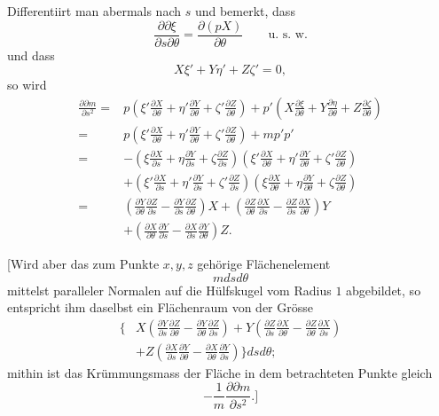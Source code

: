 %
\par\indent Differentiirt man abermals nach $s$ und bemerkt, dass
\[
\frac{\partial\partial\xi}{\partial s\partial\theta}=\frac{\partial(pX)}{\partial\theta}\qquad\text{u. s. w.}
\]
und dass
\[
X\xi'+Y\eta'+Z\zeta'=0,
\]
so wird
\[
\begin{aligned}
\frac{\partial\partial m}{\partial s^{2}}={}&p\left(\xi'\frac{\partial X}{\partial\theta}+\eta'\frac{\partial Y}{\partial\theta}+\zeta'\frac{\partial Z}{\partial\theta}\right)+p'\left(X\frac{\partial\xi}{\partial\theta}+Y\frac{\partial\eta}{\partial\theta}+Z\frac{\partial\zeta}{\partial\theta}\right)\\
={}&p\left(\xi'\frac{\partial X}{\partial\theta}+\eta'\frac{\partial Y}{\partial\theta}+\zeta'\frac{\partial Z}{\partial\theta}\right)+mp'p'\\
={}&-\left(\xi\frac{\partial X}{\partial s}+\eta\frac{\partial Y}{\partial s}+\zeta\frac{\partial Z}{\partial s}\right)\left(\xi'\frac{\partial X}{\partial\theta}+\eta'\frac{\partial Y}{\partial\theta}+\zeta'\frac{\partial Z}{\partial\theta}\right)\\
&+\left(\xi'\frac{\partial X}{\partial s}+\eta'\frac{\partial Y}{\partial s}+\zeta'\frac{\partial Z}{\partial s}\right)\left(\xi\frac{\partial X}{\partial\theta}+\eta\frac{\partial Y}{\partial\theta}+\zeta\frac{\partial Z}{\partial\theta}\right)\\
={}&\left(\frac{\partial Y}{\partial\theta}\frac{\partial Z}{\partial s}-\frac{\partial Y}{\partial s}\frac{\partial Z}{\partial\theta}\right)X+\left(\frac{\partial Z}{\partial\theta}\frac{\partial X}{\partial s}-\frac{\partial Z}{\partial s}\frac{\partial X}{\partial\theta}\right)Y\\
&+\left(\frac{\partial X}{\partial\theta}\frac{\partial Y}{\partial s}-\frac{\partial X}{\partial s}\frac{\partial Y}{\partial\theta}\right)Z.
\end{aligned}
\]

[Wird aber das zum Punkte $x,y,z$ gehörige Flächenelement
\[
mdsd\theta
\]
mittelst paralleler Normalen auf die Hülfskugel vom Radius $1$ abgebildet, so entspricht ihm daselbst ein Flächenraum von der Grösse
\[
\begin{aligned}
\Biggl\{&X\left(\frac{\partial Y}{\partial s}\frac{\partial Z}{\partial\theta}-\frac{\partial Y}{\partial\theta}\frac{\partial Z}{\partial s}\right)+Y\left(\frac{\partial Z}{\partial s}\frac{\partial X}{\partial\theta}-\frac{\partial Z}{\partial\theta}\frac{\partial X}{\partial s}\right)\\
&+Z\left(\frac{\partial X}{\partial s}\frac{\partial Y}{\partial\theta}-\frac{\partial X}{\partial\theta}\frac{\partial Y}{\partial s}\right)\Biggr\}dsd\theta;
\end{aligned}
\]
mithin ist das Krümmungsmass der Fläche in dem betrachteten Punkte gleich
\[
-\frac1m\frac{\partial\partial m}{\partial s^{2}}.\biggr]
\]
